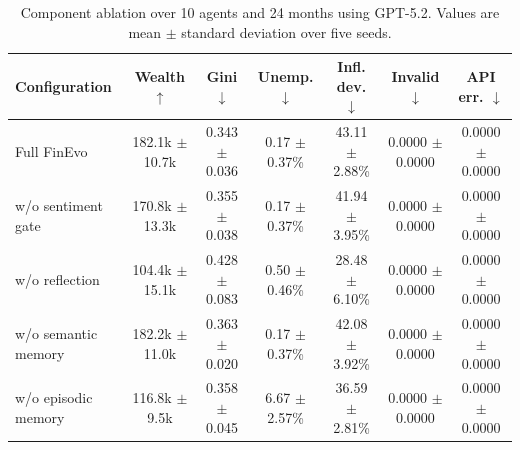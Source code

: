 \ifdefined\FinEvoAllowHistoricalPrePZeroEvidence\else
{}
\fi
\begin{table}[t]
\centering
\small
\setlength{\tabcolsep}{4pt}
\begin{tabular}{lcccccc}
\toprule
Configuration & Wealth $\uparrow$ & Gini $\downarrow$ & Unemp. $\downarrow$ & Infl. dev. $\downarrow$ & Invalid $\downarrow$ & API err. $\downarrow$ \\
\midrule
Full FinEvo & 182.1k $\pm$ 10.7k & 0.343 $\pm$ 0.036 & 0.17 $\pm$ 0.37\% & 43.11 $\pm$ 2.88\% & 0.0000 $\pm$ 0.0000 & 0.0000 $\pm$ 0.0000 \\
w/o sentiment gate & 170.8k $\pm$ 13.3k & 0.355 $\pm$ 0.038 & 0.17 $\pm$ 0.37\% & 41.94 $\pm$ 3.95\% & 0.0000 $\pm$ 0.0000 & 0.0000 $\pm$ 0.0000 \\
w/o reflection & 104.4k $\pm$ 15.1k & 0.428 $\pm$ 0.083 & 0.50 $\pm$ 0.46\% & 28.48 $\pm$ 6.10\% & 0.0000 $\pm$ 0.0000 & 0.0000 $\pm$ 0.0000 \\
w/o semantic memory & 182.2k $\pm$ 11.0k & 0.363 $\pm$ 0.020 & 0.17 $\pm$ 0.37\% & 42.08 $\pm$ 3.92\% & 0.0000 $\pm$ 0.0000 & 0.0000 $\pm$ 0.0000 \\
w/o episodic memory & 116.8k $\pm$ 9.5k & 0.358 $\pm$ 0.045 & 6.67 $\pm$ 2.57\% & 36.59 $\pm$ 2.81\% & 0.0000 $\pm$ 0.0000 & 0.0000 $\pm$ 0.0000 \\
\bottomrule
\end{tabular}
\caption{Component ablation over 10 agents and 24 months using GPT-5.2. Values are mean $\pm$ standard deviation over five seeds.}
\label{tab:component_ablation}
\end{table}

